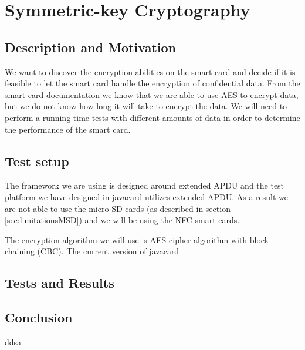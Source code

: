 \section{Symmetric-key Cryptography}
\subsection{Description and Motivation}
We want to discover the encryption abilities on the smart card and decide if it is feasible to let the smart card handle the encryption of confidential data. From the smart card documentation we know that we are able to use AES to encrypt data, but we do not know how long it will take to encrypt the data. We will need to perform a running time tests with different amounts of data in order to determine the performance of the smart card.

\subsection{Test setup}
The framework we are using is designed around extended APDU and the test platform we have designed in javacard utilizes extended APDU. As a result we are not able to use the micro SD cards (as described in section \ref{sec:limitationsMSD}) and we will be using the NFC smart cards.

The encryption algorithm we will use is AES cipher algorithm with block chaining (CBC). The current version of javacard 

\subsection{Tests and Results}


\subsection{Conclusion}
ddsa
